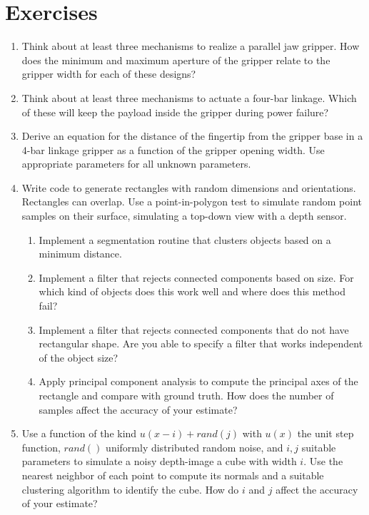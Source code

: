 \section{Exercises}
\begin{enumerate}
\item Think about at least three mechanisms to realize a parallel jaw gripper. How does the minimum and maximum aperture of the gripper relate to the gripper width for each of these designs?
\item Think about at least three mechanisms to actuate a four-bar linkage. Which of these will keep the payload inside the gripper during power failure?
\item Derive an equation for the distance of the fingertip from the gripper base in a 4-bar linkage gripper as a function of the gripper opening width. Use appropriate parameters for all unknown parameters. 
\item Write code to generate rectangles with random dimensions and orientations. Rectangles can overlap. Use a point-in-polygon test to simulate random point samples on their surface, simulating a top-down view with a depth sensor.
\begin{enumerate}
\item Implement a segmentation routine that clusters objects based on a minimum distance.
\item Implement a filter that rejects connected components based on size. For which kind of objects does this work well and where does this method fail?
\item Implement a filter that rejects connected components that do not have rectangular shape. Are you able to specify a filter that works independent of the object size?
\item Apply principal component analysis to compute the principal axes of the rectangle and compare with ground truth. How does the number of samples affect the accuracy of your estimate?
\end{enumerate}
\item Use a function of the kind $u(x-i)+rand(j)$ with $u(x)$ the unit step function, $rand()$ uniformly distributed random noise, and $i,j$ suitable parameters to simulate a noisy depth-image a cube with width $i$. Use the nearest neighbor of each point to compute its normals and a suitable clustering algorithm to identify the cube. How do $i$ and $j$ affect the accuracy of your estimate?
\end{enumerate}
